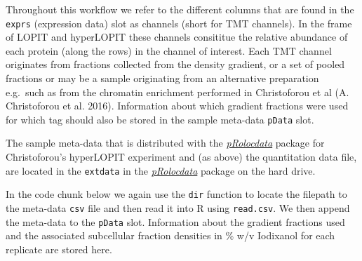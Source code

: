 Throughout this workflow we refer to the different columns that are
found in the \texttt{exprs} (expression data) slot as channels (short
for TMT channels). In the frame of LOPIT and hyperLOPIT these channels
consititue the relative abundance of each protein (along the rows) in
the channel of interest. Each TMT channel originates from fractions
collected from the density gradient, or a set of pooled fractions or may
be a sample originating from an alternative preparation e.g.~such as
from the chromatin enrichment performed in Christoforou et al (A.
Christoforou et al. 2016). Information about which gradient fractions
were used for which tag should also be stored in the sample meta-data
\texttt{pData} slot.

The sample meta-data that is distributed with the
\emph{\href{http://bioconductor.org/packages/pRolocdata}{pRolocdata}}
package for Christoforou's hyperLOPIT experiment and (as above) the
quantitation data file, are located in the \texttt{extdata} in the
\emph{\href{http://bioconductor.org/packages/pRolocdata}{pRolocdata}}
package on the hard drive.

In the code chunk below we again use the \texttt{dir} function to locate
the filepath to the meta-data \texttt{csv} file and then read it into R
using \texttt{read.csv}. We then append the meta-data to the
\texttt{pData} slot. Information about the gradient fractions used and
the associated subcellular fraction densities in \% w/v Iodixanol for
each replicate are stored here.

\begin{Shaded}
\begin{Highlighting}[]
\StringTok{ } \NormalTok{,}
                \NormalTok{)}

\StringTok{ }\NormalTok{, } \NormalTok{, }
                      \NormalTok{, } \NormalTok{)}

\StringTok{ }\NormalTok{(fracinfo[, }\NormalTok{], fracinfo[, }\NormalTok{])}
\StringTok{ }\NormalTok{(fracinfo[, }\NormalTok{], fracinfo[, }\NormalTok{])}
\end{Highlighting}
\end{Shaded}

